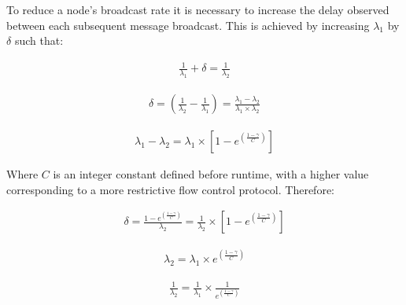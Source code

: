     To reduce a node's broadcast rate it is necessary to increase the delay observed between each subsequent message broadcast.  This is achieved by increasing $\lambda_1$ by $\delta$ such that:
    
    \begin{equation} \label{eq:rate_plus_delta}
		     \begin{aligned}
		         \frac{1}{\lambda_1} + \delta = \frac{1}{\lambda_2}
		     \end{aligned}
    \end{equation} 
    
    \begin{equation}
		     \begin{aligned}
		         \delta = (\frac{1}{\lambda_2} - \frac{1}{\lambda_1}) = \frac{\lambda_1 - \lambda_2}{\lambda_1 \times \lambda_2}
		     \end{aligned}
    \end{equation} 
        
    \begin{equation}
		     \begin{aligned}
		         \lambda_1 - \lambda_2 = \lambda_1 \times [1 - e ^{ ({\frac{1-\gamma}{C}})}]
		     \end{aligned}
    \end{equation} 
    
    Where $C$ is an integer constant defined before runtime, with a higher value corresponding to a more restrictive flow control protocol.  
    Therefore:
    
    \begin{equation}
		     \begin{aligned}
		         \delta = \frac{1 - e ^{ ({\frac{1-\gamma}{C}})}}{\lambda_2} = \frac{1}{\lambda_2} \times [1 - e ^{ ({\frac{1-\gamma}{C}})}]
		     \end{aligned}
    \end{equation}
    
    \begin{equation}
		     \begin{aligned}
		         \lambda_2 = \lambda_1 \times e ^{ ({\frac{1-\gamma}{C}})}
		     \end{aligned}
    \end{equation}     
    
    \begin{equation}
		     \begin{aligned}
		         \frac{1}{\lambda_2} = \frac{1}{\lambda_1} \times \frac{1}{e ^{ ({\frac{1-\gamma}{C}})}}
		     \end{aligned}
    \end{equation}
    
